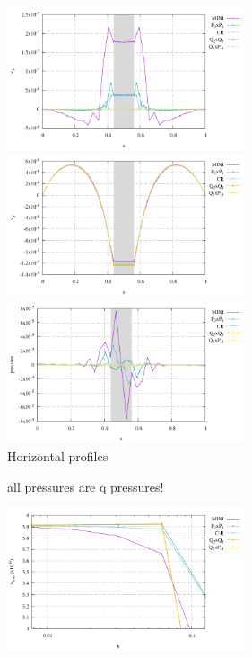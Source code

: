 \begin{center}
\includegraphics[width=7cm]{python_codes/fieldstone_112/results/exp2/hprofile_u.pdf}
\includegraphics[width=7cm]{python_codes/fieldstone_112/results/exp2/hprofile_v.pdf}
\includegraphics[width=7cm]{python_codes/fieldstone_112/results/exp2/hprofile_p.pdf}\\
{\captionfont Horizontal profiles}
\end{center}

all pressures are q pressures!

\includegraphics[width=7cm]{python_codes/fieldstone_112/results/exp2/vrms.pdf}














